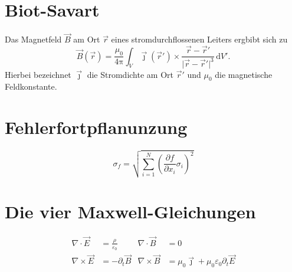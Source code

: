 \documentclass{scrartcl}
\begin{document}
\section{Biot-Savart}
Das Magnetfeld $\vec{B}$ am Ort $\vec{r}$ eines stromdurchflossenen Leiters ergbibt sich zu
\begin{equation}
  \vec{B}(\vec{r}) = \frac{\mu_0}{4\mathup{\pi}}
  \int_V \vec{\jmath}(\vec{r}') \times \frac{\vec{r} - \vec{r}'}{\lvert \vec{r} - \vec{r}' \rvert^3} \, \mathup{d}V' .
\end{equation}
Hierbei bezeichnet $\vec{\jmath}$ die Stromdichte am Ort $\vec{r}'$ und $\mu_0$ die magnetische Feldkonstante.

\section{Fehlerfortpflanunzung}
\begin{equation}
  \sigma_f = \sqrt{\sum\limits_{i=1}^N \left( \frac{\partial f}{\partial x_i}
                   \sigma_i \right)^{\!\!2}}
\end{equation}

\section{Die vier Maxwell-Gleichungen}
\begin{align}
  \nabla \cdot  \vec{E} &= \frac{\rho}{\varepsilon_0} &
  \nabla \cdot  \vec{B} &= 0 \\
  \nabla \times \vec{E} &= - \partial_t \vec{B} &
  \nabla \times \vec{B} &= \mu_0 \vec{\jmath} + \mu_0 \varepsilon_0 \partial_t \vec{E}
\end{align}
\end{document}
